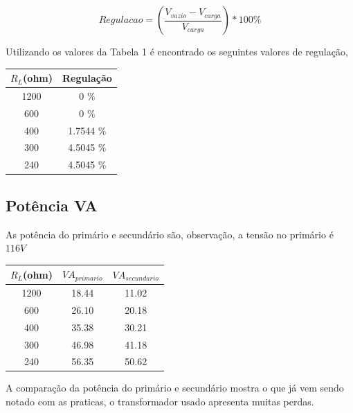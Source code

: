 \documentclass[paper=a4, fontsize=11pt]{article}
\begin{document}
\begin{equation}
    Regulacao = \left( \frac{V_{vazio} - V_{carga}}{V_{carga}} \right)*100\%
\end{equation}

Utilizando os valores da Tabela 1 é encontrado os seguintes valores de regulação,

\renewcommand{\arraystretch}{1.5}
\begin{center}

    \begin{tabular}{c||c}
        $R_L$(ohm) & Regulação \\
        \hline
        1200 & 0 $\%$ \\
        600 &  0 $\%$ \\
        400 &  1.7544 $\%$ \\
        300 &  4.5045 $\%$ \\
        240 &  4.5045 $\%$ \\
    \end{tabular}
\end{center}

\subsection{Potência VA}

As potência do primário e secundário são, observação, a tensão no primário
é $116 V$
\renewcommand{\arraystretch}{1.5}
\begin{center}

    \begin{tabular}{c||c||c}
        $R_L$(ohm) & $VA_{primario}$ & $VA_{secundario}$ \\
        \hline
        1200 & 18.44 & 11.02 \\
        600 &  26.10 & 20.18 \\
        400 &  35.38 & 30.21 \\
        300 &  46.98 & 41.18 \\
        240 &  56.35 & 50.62 \\
    \end{tabular}
\end{center}

A comparação da potência do primário e secundário mostra o que já vem
sendo notado com as praticas, o transformador usado apresenta muitas perdas.

\end{document}
